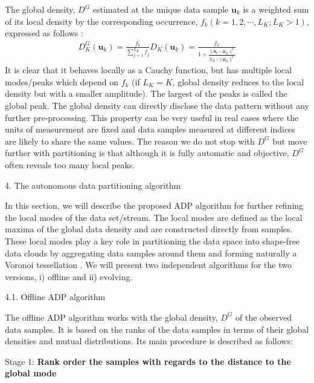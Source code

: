 {The global density, $D^G$ estimated at the unique data sample $\bm u_k$ is a weighted sum of its local density by the corresponding occurrence, $f_k (k = 1, 2, \cdots, L_K;L_K > 1)$, expressed as follows \cite{Angelov2016-7844219,Angelov2017Empirical}:
\begin{align}\label{EDAlocaldensity18072407}
 D^G_K(\bm u_k) = \frac {f_k} {\sum_{j=1}^{L_K} f_j} D_K(\bm u_k) =  \frac {f_k}{1 + \frac{\|\bm u_k-\bm\mu_K\|^2}{X_K-\|\bm \mu_K\|^2}}
\end{align}
It is clear that it behaves locally as a Cauchy function, but has multiple local modes/peaks which depend on $f_k$ (if $L_K = K$, global density reduces to the local density but with a smaller amplitude). The largest of the peaks is called the global peak. The global density can directly disclose the data pattern without any further pre-processing. This property can be very useful in real cases where the units of measurement are fixed and data samples measured at different indices are likely to share the same values. The reason we do not stop with $D^G$ but move further with partitioning is that although it is fully automatic and objective, $D^G$ often reveals too many local peaks.

4. The autonomous data partitioning algorithm

In this section, we will describe the proposed ADP algorithm for further refining the local modes of the data set/stream. The local modes are defined as the local maxima of the global data density and are constructed directly from samples. These local modes play a key role in partitioning the data space into shape-free data clouds \cite{Angelov2012Autonomous,Angelov2014Outside} by aggregating data samples around them and forming naturally a Voronoi tessellation \cite{OkabeBoots2000-5677}. We will present two independent algorithms for the two versions, i) offline and ii) evolving.

4.1. Offline ADP algorithm

The offline ADP algorithm works with the global density, $D^G$ of the observed data samples. It is based on the ranks of the data samples in terms of their global densities and mutual distributions. Its main procedure is described as follows:

Stage 1: \textbf{Rank order the samples with regards to the distance to the global mode}

}
